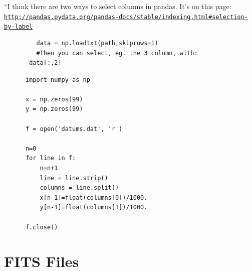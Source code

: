 \documentclass[11pt,a4paper]{article}
\begin{document}
      ``I think there are two ways to select columns in pandas. 
       It’s on this page: 
       \href{http://pandas.pydata.org/pandas-docs/stable/indexing.html\#selection-by-label}{\tt http://pandas.pydata.org/pandas-docs/stable/indexing.html\#selection-by-label}        \\
       \begin{lstlisting}
         data = np.loadtxt(path,skiprows=1)
         #Then you can select, eg. the 3 column, with:
       data[:,2]
      \end{lstlisting}
    \medskip     \medskip     \medskip


    \begin{lstlisting}
      import numpy as np

      x = np.zeros(99)
      y = np.zeros(99)
      
      f = open('datums.dat', 'r')
      
      n=0
      for line in f:
          n=n+1
          line = line.strip()
          columns = line.split()
          x[n-1]=float(columns[0])/1000.
          y[n-1]=float(columns[1])/1000.
          
      f.close()
    \end{lstlisting}





\newpage
\section{FITS Files}\label{sec:FITS}
\end{document}
